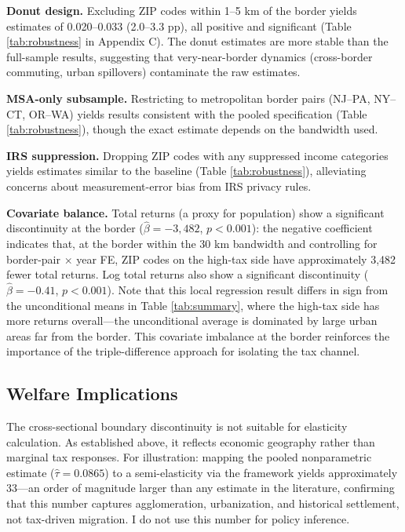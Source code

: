 \documentclass[12pt]{article}
\begin{document}
\textbf{Donut design.} Excluding ZIP codes within 1--5 km of the border yields estimates of 0.020--0.033 (2.0--3.3 pp), all positive and significant (Table \ref{tab:robustness} in Appendix C). The donut estimates are more stable than the full-sample results, suggesting that very-near-border dynamics (cross-border commuting, urban spillovers) contaminate the raw estimates.

\textbf{MSA-only subsample.} Restricting to metropolitan border pairs (NJ--PA, NY--CT, OR--WA) yields results consistent with the pooled specification (Table \ref{tab:robustness}), though the exact estimate depends on the bandwidth used.

\textbf{IRS suppression.} Dropping ZIP codes with any suppressed income categories yields estimates similar to the baseline (Table \ref{tab:robustness}), alleviating concerns about measurement-error bias from IRS privacy rules.

\textbf{Covariate balance.} Total returns (a proxy for population) show a significant discontinuity at the border ($\hat{\beta} = -3{,}482$, $p < 0.001$): the negative coefficient indicates that, at the border within the 30 km bandwidth and controlling for border-pair $\times$ year FE, ZIP codes on the high-tax side have approximately 3,482 fewer total returns. Log total returns also show a significant discontinuity ($\hat{\beta} = -0.41$, $p < 0.001$). Note that this local regression result differs in sign from the unconditional means in Table \ref{tab:summary}, where the high-tax side has more returns overall---the unconditional average is dominated by large urban areas far from the border. This covariate imbalance at the border reinforces the importance of the triple-difference approach for isolating the tax channel.



\subsection{Welfare Implications}

The cross-sectional boundary discontinuity is not suitable for elasticity calculation. As established above, it reflects economic geography rather than marginal tax responses. For illustration: mapping the pooled nonparametric estimate ($\hat{\tau} = 0.0865$) to a semi-elasticity via the \citet{kleven2014migration} framework yields approximately 33---an order of magnitude larger than any estimate in the literature, confirming that this number captures agglomeration, urbanization, and historical settlement, not tax-driven migration. I do not use this number for policy inference.
\end{document}

